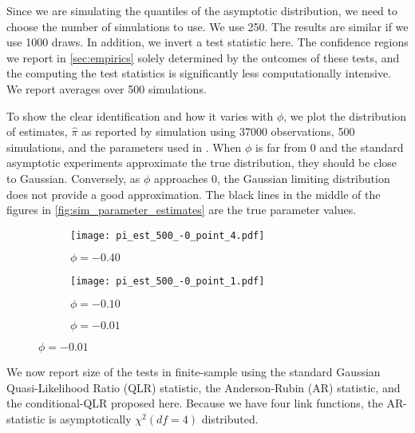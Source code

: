 \documentclass[11pt, letterpaper, twoside]{article}
\begin{document}


Since we are simulating the quantiles of the asymptotic distribution, we need to choose the number of simulations to use. We use \num{250}. The results are similar if we use \num{1000} draws. In addition, we invert a test statistic here. The confidence regions we report in \cref{sec:empirics} solely determined by the outcomes of these tests, and the computing the test statistics is significantly less computationally intensive.
We report averages over \num{500} simulations.

To show the clear identification and how it varies with $\phi$, we plot the distribution of estimates, $\widehat{\pi}$ as reported by simulation using \num{37000} observations, \num{500} simulations, and the parameters used in \textcite{han2018leverage}. When $\phi$ is far from $0$ and the standard asymptotic experiments approximate the true distribution, they should be close to Gaussian. Conversely, as $\phi$ approaches $0$, the Gaussian limiting distribution does not provide a good approximation. The black lines in the middle of the figures in \cref{fig:sim_parameter_estimates} are the true parameter values.


\begin{figure}[htb]
    
    \caption[t-statistics]{Parameter Estimates}
    \label{fig:sim_parameter_estimates}


    \begin{subfigure}[t]{.32\textwidth}
        \caption[phi = -0.40]{$\phi = -0.40$}
        \texttt{[image: pi\_est\_500\_-0\_point\_4.pdf]}
    \end{subfigure}
    \begin{subfigure}[t]{.32\textwidth}
        \caption[phi = -0.10]{$\phi = -0.10$}
        \texttt{[image: pi\_est\_500\_-0\_point\_1.pdf]}
    \end{subfigure}
    \begin{subfigure}[t]{.32\textwidth}
        \caption[phi = -0.01]{$\phi = -0.01$}
    \end{subfigure}

\end{figure}

We now report size of the tests in finite-sample using the standard Gaussian Quasi-Likelihood Ratio (QLR) statistic, the Anderson-Rubin (AR) statistic, and the conditional-QLR  proposed here.
Because we have four link functions, the AR-statistic is asymptotically $\chi^2(df=4)$ distributed.
\end{document}
